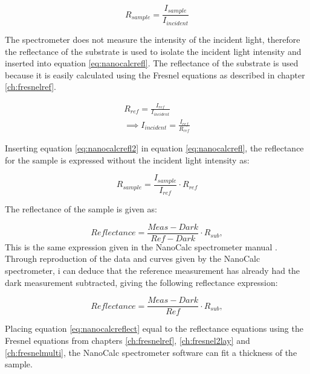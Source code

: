\documentclass[MasterThesisMain.tex]{subfiles}
\begin{document}
\begin{equation}\label{eq:nanocalcrefl}
R_{sample} = \frac{I_{sample}}{I_{incident}}
\end{equation}

The spectrometer does not measure the intensity of the incident light, therefore the reflectance of the substrate is used to isolate the incident light intensity and inserted into equation \ref{eq:nanocalcrefl}. The reflectance of the substrate is used because it is easily calculated using the Fresnel equations as described in chapter \ref{ch:fresnelref}.

\begin{align}
R_{ref} = \frac{I_{ref}}{I_{incident}}\\
\implies  I_{incident} = \frac{I_{ref}}{R_{ref}} \label{eq:nanocalcrefl2}
\end{align}

Inserting equation \ref{eq:nanocalcrefl2} in equation \ref{eq:nanocalcrefl}, the reflectance for the sample is expressed without the incident light intensity as:

\begin{equation}
R_{sample} = \frac{I_{sample}}{I_{ref}} \cdot R_{ref}
\end{equation}

The reflectance of the sample is given as:

\begin{equation}
Reflectance = \frac{Meas-Dark}{Ref-Dark} \cdot R_{sub},
\end{equation}
This is the same expression given in the NanoCalc spectrometer manual \cite{nanocalcmanual}. Through reproduction of the data and curves given by the NanoCalc spectrometer, i can deduce that the reference measurement has already had the dark measurement subtracted, giving the following reflectance expression:

\begin{equation}\label{eq:nanocalcreflect}
Reflectance = \frac{Meas-Dark}{Ref} \cdot R_{sub},
\end{equation}

Placing equation \ref{eq:nanocalcreflect} equal to the reflectance equations using the Fresnel equations from chapters  \ref{ch:fresnelref}, \ref{ch:fresnel2lay} and \ref{ch:fresnelmulti}, the NanoCalc spectrometer software can fit a thickness of the sample.
\end{document}
